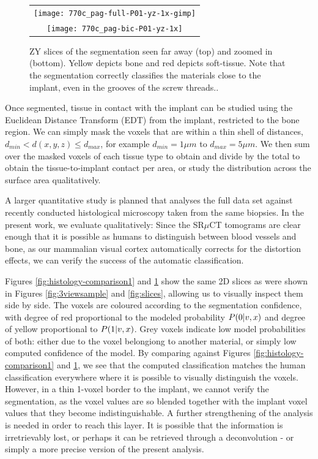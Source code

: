 \begin{figure}
  \centering
  \begin{tabular}{c}
    \texttt{[image: 770c\_pag-full-P01-yz-1x-gimp]} \\
    \texttt{[image: 770c\_pag-bic-P01-yz-1x]}
  \end{tabular}
  \caption{ZY slices of the segmentation seen far away (top) and zoomed in (bottom). Yellow depicts bone and red depicts soft-tissue. Note that the segmentation correctly classifies the materials close to the implant, even in the grooves of the screw threads..}
  \label{fig:histology-comparison2}
\end{figure}


Once segmented, tissue in contact with the implant can be studied using the
Euclidean Distance Transform (EDT) from the implant, restricted to the bone region. We can
simply mask the voxels that are within a thin shell of distances, $d_{min} < d(x,y,z) \le d_{max}$,
for example $d_{min} = 1\mu m$ to $d_{max} = 5\mu m$. We then sum over the masked voxels of each
tissue type to obtain and divide by the total to obtain the tissue-to-implant contact per area,
or study the distribution across the surface area qualitatively.

A larger quantitative study is planned that analyses the full data set against recently conducted 
histological microscopy taken from the same biopsies. In the present work, we evaluate qualitatively:
Since the SR$\mu$CT tomograms are
clear enough that it is possible as humans to distinguish between blood vessels and bone,
as our mammalian visual cortex automatically corrects for the distortion effects, we can verify
the success of the automatic classification.

Figures \ref{fig:histology-comparison1} and \ref{fig:histology-comparison2} show the same 2D slices
as were shown in Figures \ref{fig:3viewsample} and \ref{fig:slices}, allowing us to visually inspect
them side by side. The voxels are coloured according to the segmentation confidence, with
degree of red proportional to the modeled probability $P(0|v,x)$ and degree of yellow proportional
to $P(1|v,x)$. Grey voxels indicate low model probabilities of both: either due to the voxel belongiong
to another material, or simply low computed confidence of the model.
By comparing against Figures \ref{fig:histology-comparison1} and \ref{fig:histology-comparison2},
we see that the computed classification matches the human classification everywhere where it
is possible to visually distinguish the voxels. However, in a thin 1-voxel border
to the implant, we cannot verify the segmentation, as the voxel values are so blended together
with the implant voxel values that they become indistinguishable. A further strengthening of the analysis
is needed in order to reach this layer. It is possible that the information is irretrievably lost, or perhaps it
can be retrieved through a deconvolution - or simply a more precise version of the present analysis.


